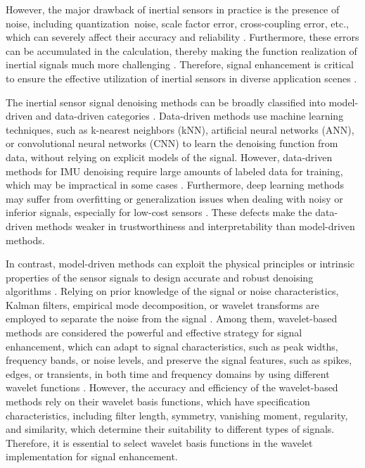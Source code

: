 \documentclass[letterpaper]{article} %
\begin{document}
	However, the major drawback of inertial sensors in practice is the presence of noise, including quantization noise, scale factor error, cross-coupling error, etc., which can severely affect their accuracy and reliability \cite{chen2020deep}.
	Furthermore, these errors can be accumulated in the calculation, thereby making the function realization of inertial signals much more challenging \cite{10080916, saha2022tinyodom, saha2023inertial}.
	Therefore, signal enhancement is critical to ensure the effective utilization of inertial sensors in diverse application scenes \cite{caesar2020nuscenes}.

	The inertial sensor signal denoising methods can be broadly classified into model-driven and data-driven categories \cite{golestani2020human}. Data-driven methods use machine learning techniques, such as k-nearest neighbors (kNN), artificial neural networks (ANN), or convolutional neural networks (CNN) \cite{engelsman2023data} to learn the denoising function from data, without relying on explicit models of the signal.
	However, data-driven methods for IMU denoising require large amounts of labeled data for training, which may be impractical in some cases \cite{herath2020ronin}. Furthermore, deep learning methods may suffer from overfitting or generalization issues when dealing with noisy or inferior signals, especially for low-cost sensors \cite{yuan2023simple}. These defects make the data-driven methods weaker in trustworthiness and interpretability than model-driven methods.

	In contrast, model-driven methods can exploit the physical principles or intrinsic properties of the sensor signals \cite{9119813} to design accurate and robust denoising algorithms \cite{min2021drop}. Relying on prior knowledge of the signal or noise characteristics, Kalman filters, empirical mode decomposition, or wavelet transforms are employed to separate the noise from the signal \cite{liu2020denoising,he2019noise}. Among them, wavelet-based methods are considered the powerful and effective strategy for signal enhancement, which can adapt to signal characteristics, such as peak widths, frequency bands, or noise levels, and preserve the signal features, such as spikes, edges, or transients, in both time and frequency domains by using different wavelet functions \cite{saydjari2022equivariant}. However, the accuracy and efficiency of the wavelet-based methods rely on their wavelet basis functions, which have specification characteristics, including filter length, symmetry, vanishing moment, regularity, and similarity, which determine their suitability to different types of signals. Therefore, it is essential to select wavelet basis functions in the wavelet implementation for signal enhancement.
\end{document}

